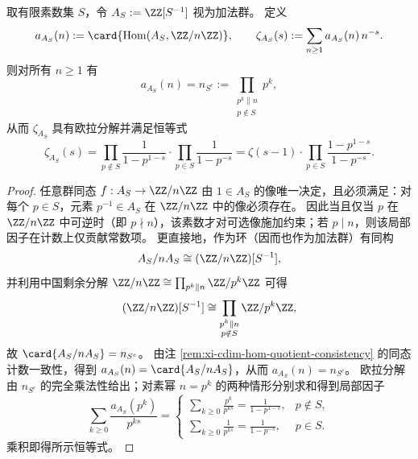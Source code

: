 \begin{theorem}\label{thm:xi-cdim-localization-zeta-AS}
取有限素数集 \(S\)，令 \(A_S:=\ZZ[S^{-1}]\) 视为加法群。
定义
\[
a_{A_S}(n):=\card{\operatorname{Hom}(A_S,\ZZ/n\ZZ)},\qquad
\zeta_{A_S}(s):=\sum_{n\ge 1}a_{A_S}(n)\,n^{-s}.
\]
则对所有 \(n\ge 1\) 有
\[
a_{A_S}(n)=n_{S^c}:=\prod_{\substack{p^k\parallel n\\ p\notin S}}p^k,
\]
从而 \(\zeta_{A_S}\) 具有欧拉分解并满足恒等式
\[
\zeta_{A_S}(s)
=\prod_{p\notin S}\frac{1}{1-p^{1-s}}\cdot\prod_{p\in S}\frac{1}{1-p^{-s}}
=\zeta(s-1)\cdot\prod_{p\in S}\frac{1-p^{1-s}}{1-p^{-s}}.
\]
\end{theorem}
\begin{proof}
任意群同态 \(f:A_S\to \ZZ/n\ZZ\) 由 \(1\in A_S\) 的像唯一决定，且必须满足：对每个 \(p\in S\)，元素 \(p^{-1}\in A_S\) 在 \(\ZZ/n\ZZ\) 中的像必须存在。
因此当且仅当 \(p\) 在 \(\ZZ/n\ZZ\) 中可逆时（即 \(p\nmid n\)），该素数才对可选像施加约束；若 \(p\mid n\)，则该局部因子在计数上仅贡献常数项。
更直接地，作为环（因而也作为加法群）有同构
\[
A_S/nA_S\cong (\ZZ/n\ZZ)[S^{-1}],
\]
并利用中国剩余分解
\(
\ZZ/n\ZZ\cong \prod_{p^k\parallel n}\ZZ/p^k\ZZ
\)
可得
\[
(\ZZ/n\ZZ)[S^{-1}]\cong \prod_{\substack{p^k\parallel n\\ p\notin S}}\ZZ/p^k\ZZ,
\]
故
\(
\card{A_S/nA_S}=n_{S^c}
\)。
由注 \ref{rem:xi-cdim-hom-quotient-consistency} 的同态计数一致性，得到 \(a_{A_S}(n)=\card{A_S/nA_S}\)，从而 \(a_{A_S}(n)=n_{S^c}\)。
欧拉分解由 \(n_{S^c}\) 的完全乘法性给出；对素幂 \(n=p^k\) 的两种情形分别求和得到局部因子
\[
\sum_{k\ge 0}\frac{a_{A_S}(p^k)}{p^{ks}}
=
\begin{cases}
\sum_{k\ge 0}\frac{p^k}{p^{ks}}=\frac{1}{1-p^{1-s}},& p\notin S,\\[6pt]
\sum_{k\ge 0}\frac{1}{p^{ks}}=\frac{1}{1-p^{-s}},& p\in S.
\end{cases}
\]
乘积即得所示恒等式。
\end{proof}

